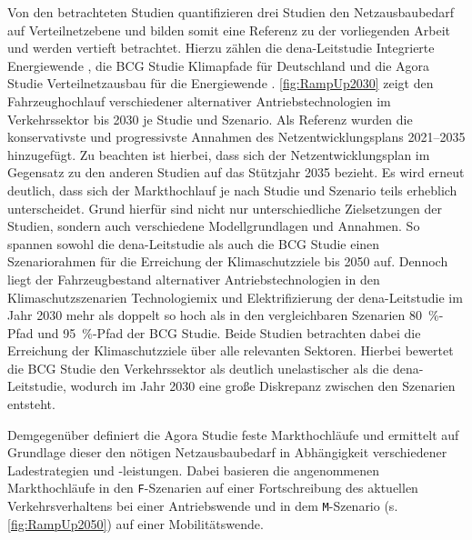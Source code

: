 

Von den betrachteten Studien quantifizieren drei Studien den Netzausbaubedarf auf Verteilnetzebene und bilden somit eine Referenz zu der vorliegenden Arbeit und werden vertieft betrachtet.
Hierzu zählen die dena-Leitstudie \glqq Integrierte Energiewende\grqq{} \cite{DEAGH2018}, die BCG Studie \glqq Klimapfade für Deutschland\grqq{} \cite{BCG2018} und die Agora Studie \glqq Verteilnetzausbau für die Energiewende\grqq{} \cite{Agora2019}.
\autoref{fig:RampUp2030} zeigt den Fahrzeughochlauf verschiedener alternativer Antriebstechnologien im Verkehrssektor bis \num{2030} je Studie und Szenario.
Als Referenz wurden die konservativste und progressivste Annahmen des Netzentwicklungsplans \numrange[range-phrase=~{--}~]{2021}{2035} \cite{BNetzA2020} hinzugefügt.
Zu beachten ist hierbei, dass sich der Netzentwicklungsplan im Gegensatz zu den anderen Studien auf das Stützjahr \num{2035} bezieht.
Es wird erneut deutlich, dass sich der Markthochlauf je nach Studie und Szenario teils erheblich unterscheidet.
Grund hierfür sind nicht nur unterschiedliche Zielsetzungen der Studien, sondern auch verschiedene Modellgrundlagen und Annahmen.
So spannen sowohl die dena-Leitstudie als auch die BCG Studie einen Szenariorahmen für die Erreichung der Klimaschutzziele bis \num{2050} auf.
Dennoch liegt der Fahrzeugbestand alternativer Antriebstechnologien in den Klimaschutzszenarien \glqq Technologiemix\grqq{} und \glqq Elektrifizierung\grqq{} der dena-Leitstudie im Jahr 2030 mehr als doppelt so hoch als in den vergleichbaren Szenarien \glqq \SI{80}{\percent}-Pfad\grqq{} und \glqq \SI{95}{\percent}-Pfad\grqq{} der BCG Studie.
Beide Studien betrachten dabei die Erreichung der Klimaschutzziele über alle relevanten Sektoren.
Hierbei bewertet die BCG Studie den Verkehrssektor als deutlich unelastischer als die dena-Leitstudie, wodurch im Jahr \num{2030} eine große Diskrepanz zwischen den Szenarien entsteht.\medskip

Demgegenüber definiert die Agora Studie feste Markthochläufe und ermittelt auf Grundlage dieser den nötigen Netzausbaubedarf in Abhängigkeit verschiedener Ladestrategien und -leistungen.
Dabei basieren die angenommenen Markthochläufe in den \texttt{F}-Szenarien auf einer Fortschreibung des aktuellen Verkehrsverhaltens bei einer Antriebswende und in dem \texttt{M}-Szenario (s. \autoref{fig:RampUp2050}) auf einer Mobilitätswende.




